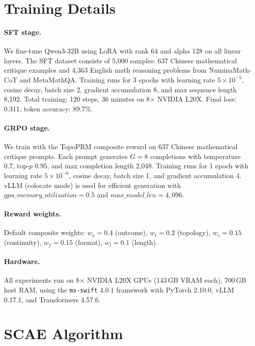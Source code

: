 \section{Training Details}
\label{app:details}

\paragraph{SFT stage.}
We fine-tune Qwen3-32B using LoRA with rank 64 and alpha 128 on all
linear layers. The SFT dataset consists of 5,000 samples: 637 Chinese
mathematical critique examples and 4,363 English math reasoning problems
from NuminaMath-CoT and MetaMathQA. Training runs for 3 epochs with
learning rate $5 \times 10^{-5}$, cosine decay, batch size 2, gradient
accumulation 8, and max sequence length 8,192. Total training: 120 steps,
36 minutes on 8$\times$ NVIDIA L20X. Final loss: 0.311, token accuracy:
89.7\%.

\paragraph{GRPO stage.}
We train with the TopoPRM composite reward on 637 Chinese mathematical
critique prompts. Each prompt generates $G = 8$ completions with
temperature 0.7, top-$p$ 0.95, and max completion length 2,048. Training
runs for 1 epoch with learning rate $5 \times 10^{-6}$, cosine decay,
batch size 1, and gradient accumulation 4. vLLM (colocate mode) is used
for efficient generation with $\mathit{gpu\_memory\_utilization} = 0.5$
and $\mathit{max\_model\_len} = 4{,}096$.

\paragraph{Reward weights.}
Default composite weights:
$w_o = 0.4$ (outcome),
$w_t = 0.2$ (topology),
$w_c = 0.15$ (continuity),
$w_f = 0.15$ (format),
$w_l = 0.1$ (length).

\paragraph{Hardware.}
All experiments run on 8$\times$ NVIDIA L20X GPUs (143\,GB VRAM each),
700\,GB host RAM, using the \texttt{ms-swift} 4.0.1 framework with
PyTorch 2.10.0, vLLM 0.17.1, and Transformers 4.57.6.

\section{SCAE Algorithm}
\label{app:scae}

